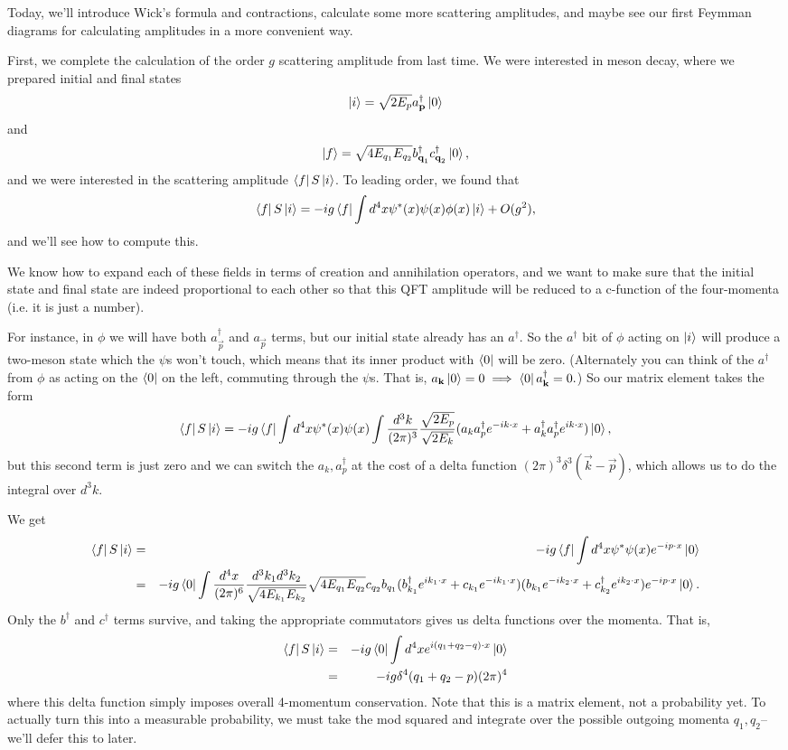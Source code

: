 Today, we'll introduce Wick's formula and contractions, calculate some more scattering amplitudes, and maybe see our first Feymman diagrams for calculating amplitudes in a more convenient way.

First, we complete the calculation of the order $g$ scattering amplitude from last time. We were interested in meson decay, where we prepared initial and final states
$$\left| i \right>=\sqrt{2E_p}a_{\boldsymbol{\mathbf{p}}}^\dagger \left| 0 \right>$$
and
$$\left| f \right>=\sqrt{4E_{q_1}E_{q_2}}b_{\boldsymbol{\mathbf{q}}_1}^\dagger c_{\boldsymbol{\mathbf{q}}_2}^\dagger \left| 0 \right>,$$
and we were interested in the scattering amplitude $\left< f \right|S \left| i \right>$. To leading order, we found that
$$\left< f \right|S\left| i \right>=-ig \left< f \right|\int d^4 x \psi^* (x) \psi(x) \phi(x) \left| i \right> + O(g^2),$$
and we'll see how to compute this.

We know how to expand each of these fields in terms of creation and annihilation operators, and we want to make sure that the initial state and final state are indeed proportional to each other so that this QFT amplitude will be reduced to a c-function of the four-momenta (i.e. it is just a number). 

For instance, in $\phi$ we will have both $a_{\vec p}^\dagger$ and $a_{\vec p}$ terms, but our initial state already has an $a^\dagger$. So the $a^\dagger$ bit of $\phi$ acting on $\left| i \right>$ will produce a two-meson state which the $\psi$s won't touch, which means that its inner product with $\left< 0 \right|$ will be zero. (Alternately you can think of the $a^\dagger$ from $\phi$ as acting on the $\left< 0 \right|$ on the left, commuting through the $\psi$s. That is, $a_{\boldsymbol{\mathbf{k}}}\left| 0 \right>=0\implies \left< 0 \right| a_{\boldsymbol{\mathbf{k}}}^\dagger =0.$) So our matrix element takes the form
$$\left< f \right|S\left| i \right>=-ig \left< f \right| \int d^4x \psi^*(x) \psi(x)\int \frac{d^3k}{(2\pi)^3}\frac{\sqrt{2E_p}}{\sqrt{2E_k}}(a_k a_p^\dagger e^{-ik\cdot x}+a_k^\dagger a_p^\dagger e^{ik\cdot x})\left| 0 \right>,$$
but this second term is just zero and we can switch the $a_k, a_p^\dagger$ at the cost of a delta function $(2\pi)^3 \delta^3(\vec k -\vec p)$, which allows us to do the integral over $d^3k$.

We get
\begin{eqnarray*}
\left< f \right|S\left| i \right>&=&-ig\left< f \right| \int d^4x \psi^* \psi(x)e^{-ip\cdot x}\left| 0 \right>\\
&=&-ig \left< 0 \right| \int \frac{d^4x}{(2\pi)^6}\frac{d^3k_1 d^3k_2}{\sqrt{4E_{k_1}E_{k_2}}} \sqrt{4E_{q_1}E_{q_2}} c_{q_2}b_{q_1} (b_{k_1}^\dagger e^{ik_1\cdot x}+c_{k_1} e^{-ik_1 \cdot x})(b_{k_1} e^{-ik_2\cdot x}+c_{k_2}^\dagger e^{ik_2 \cdot x})e^{-ip\cdot x} \left| 0 \right>.
\end{eqnarray*}
Only the $b^\dagger$ and $c^\dagger$ terms survive, and taking the appropriate commutators gives us delta functions over the momenta. That is,
\begin{eqnarray*}
\left< f \right|S\left| i \right>&=&-ig\left< 0 \right|\int d^4x e^{i(q_1+q_2-q)\cdot x}\left| 0 \right>\\
&=&-ig\delta^4(q_1+q_2-p)(2\pi)^4
\end{eqnarray*}
where this delta function simply imposes overall 4-momentum conservation. Note that this is a matrix element, not a probability yet. To actually turn this into a measurable probability, we must take the mod squared and integrate over the possible outgoing momenta $q_1,q_2$-- we'll defer this to later.


